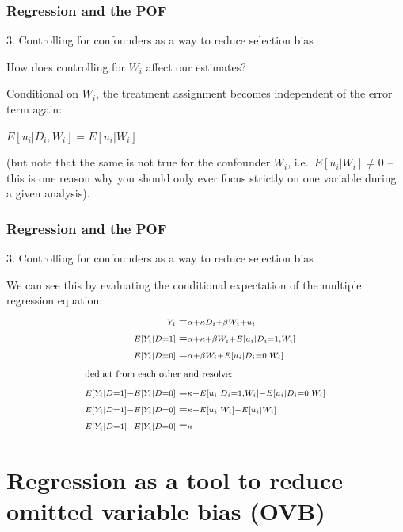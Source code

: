 \documentclass[12pt,english,dvipsnames,aspectratio=169,handout]{beamer}\usepackage[]{graphicx}\usepackage[]{xcolor}
\begin{document}
\begin{frame}
\frametitle{Regression and the POF}

3. Controlling for confounders as a way to reduce selection bias

How does controlling for $W_i$ affect our estimates?

Conditional on $W_i$, the treatment assignment becomes independent of the error term again:

$E[u_i|D_i,W_i] = E[u_i|W_i]$

\small (but note that the same is not true for the confounder $W_i$, i.e.\ $E[u_i|W_i] \neq 0$ -- this is one reason why you should only ever focus strictly on one variable during a given analysis).

\end{frame}



\begin{frame}
\frametitle{Regression and the POF}

3. Controlling for confounders as a way to reduce selection bias

We can see this by evaluating the conditional expectation of the multiple regression equation:
  \begin{align*}
  \scriptstyle Y_i                     &= \scriptstyle \alpha + \kappa D_i + \beta W_i + u_i \\
  \scriptstyle E[Y_i|D=1]              &= \scriptstyle \alpha + \kappa + \beta W_i + E[u_i|D_i=1, W_i] \\
  \scriptstyle E[Y_i|D=0]              &= \scriptstyle \alpha + \beta W_i + E[u_i|D_i=0, W_i] \\
  \shortintertext{\footnotesize deduct from each other and resolve:}
  \scriptstyle E[Y_i|D=1] - E[Y_i|D=0] &= \scriptstyle \kappa + E[u_i|D_i=1, W_i] -  E[u_i|D_i=0, W_i] \\
  \scriptstyle E[Y_i|D=1] - E[Y_i|D=0] &= \scriptstyle \kappa + E[u_i| W_i] -  E[u_i| W_i] \\
  \scriptstyle E[Y_i|D=1] - E[Y_i|D=0] &= \scriptstyle \kappa 
  \end{align*}

\end{frame}



\section{Regression as a tool to reduce omitted variable bias (OVB)}
\end{document}
